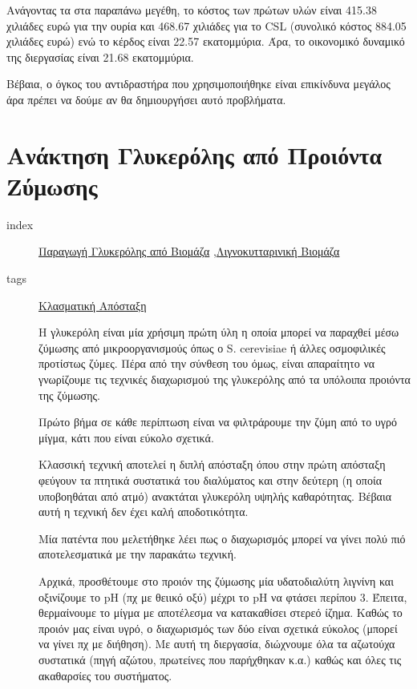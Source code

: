 \documentclass[11pt]{article}
\begin{document}
Ανάγοντας τα στα παραπάνω μεγέθη, το κόστος των πρώτων υλών είναι 415.38 χιλιάδες ευρώ για την ουρία και 468.67 χιλιάδες για το CSL (συνολικό κόστος 884.05 χιλιάδες ευρώ) ενώ το κέρδος είναι 22.57 εκατομμύρια. Άρα, το οικονομικό δυναμικό της διεργασίας είναι 21.68 εκατομμύρια.

Βέβαια, ο όγκος του αντιδραστήρα που χρησιμοποιήθηκε είναι επικίνδυνα μεγάλος άρα πρέπει να δούμε αν θα δημιουργήσει αυτό προβλήματα.

\section{Ανάκτηση Γλυκερόλης από Προιόντα Ζύμωσης}
\label{sec:orgd2cf1a7}
\begin{description}
\item[{index}] \href{\detokenize{../../../../org_roam/παραγωγη_γλυκερολης_απο_βιομαζα-13-10-22.org}}{Παραγωγή Γλυκερόλης από Βιομάζα} ,\href{\detokenize{../../../../org_roam/λιγνοκυτταρινικη_βιομαζα-09-11-22.org}}{Λιγνοκυτταρινική Βιομάζα}
\item[{tags}] \href{\detokenize{../../../../org_roam/αποσταξη-06-11-21.org}}{Κλασματική Απόσταξη} 

Η γλυκερόλη είναι μία χρήσιμη πρώτη ύλη η οποία μπορεί να παραχθεί μέσω ζύμωσης από μικροοργανισμούς όπως ο S. cerevisiae ή άλλες οσμοφιλικές προτίστως ζύμες. Πέρα από την σύνθεση του όμως, είναι απαραίτητο να γνωρίζουμε τις τεχνικές διαχωρισμού της γλυκερόλης από τα υπόλοιπα προιόντα της ζύμωσης.

Πρώτο βήμα σε κάθε περίπτωση είναι να φιλτράρουμε την ζύμη από το υγρό μίγμα, κάτι που είναι εύκολο σχετικά.

Κλασσική τεχνική αποτελεί η διπλή απόσταξη όπου στην πρώτη απόσταξη φεύγουν τα πτητικά συστατικά του διαλύματος και στην δεύτερη (η οποία υποβοηθάται από ατμό) ανακτάται γλυκερόλη υψηλής καθαρότητας. Βέβαια αυτή η τεχνική δεν έχει καλή αποδοτικότητα.

Μία πατέντα που μελετήθηκε \cite{wallersteinMethodRecoveringGlycerol1946} λέει πως ο διαχωρισμός μπορεί να γίνει πολύ πιό αποτελεσματικά με την παρακάτω τεχνική.

Αρχικά, προσθέτουμε στο προιόν της ζύμωσης μία υδατοδιαλύτη λιγνίνη και οξινίζουμε το pH (πχ με θειικό οξύ) μέχρι το pH να φτάσει περίπου 3. Έπειτα, θερμαίνουμε το μίγμα με αποτέλεσμα να κατακαθίσει στερεό ίζημα. Καθώς το προιόν μας είναι υγρό, ο διαχωρισμός των δύο είναι σχετικά εύκολος (μπορεί να γίνει πχ με διήθηση). Με αυτή τη διεργασία, διώχνουμε όλα τα αζωτούχα συστατικά (πηγή αζώτου, πρωτείνες που παρήχθηκαν κ.α.) καθώς και όλες τις ακαθαρσίες του συστήματος.


\end{description}
\end{document}
